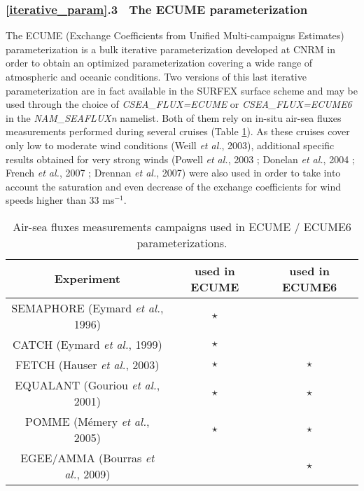 \subsubsection{\ref{iterative_param}.3 $~$ The ECUME parameterization \label{sct_UNITFP}}

The ECUME (Exchange Coefficients from Unified Multi-campaigns Estimates) parameterization is a bulk iterative parameterization 
developed at CNRM in order to obtain an optimized parameterization covering a wide range of atmospheric and oceanic conditions.
Two versions of this last iterative parameterization are in fact available in the SURFEX surface scheme and may be used through 
the choice of \textit{CSEA\_FLUX=\textquotesingle{}ECUME\textquotesingle{}} or \textit{CSEA\_FLUX=\textquotesingle{}ECUME6\textquotesingle{}}
in the \textit{NAM\_SEAFLUXn} namelist.
Both of them rely on in-situ air-sea fluxes measurements performed during several cruises (Table \ref{ecume_cruises}).
As these cruises cover only low to moderate wind conditions (Weill \textit{et al.}, 2003), %
additional specific results obtained for very strong winds 
(Powell \textit{et al.}, 2003 ; %
Donelan \textit{et al.}, 2004 ; %
French \textit{et al.}, 2007 ; %
Drennan \textit{et al.}, 2007) %
were also used in order to take into account the saturation and even decrease of the exchange coefficients
for wind speeds higher than 33 ms$^{-1}$.
\begin{table}[!h]
\centering
\begin{tabular}{|c|c|c|}
\hline
	Experiment & used in ECUME & used in ECUME6 \\
\hline
	SEMAPHORE (Eymard \textit{et al.}, 1996) & $\star$ & \\
\hline
	CATCH (Eymard \textit{et al.}, 1999) & $\star$ & \\
\hline
	FETCH (Hauser \textit{et al.}, 2003) & $\star$ & $\star$ \\
\hline
	EQUALANT (Gouriou \textit{et al.}, 2001) & $\star$ & $\star$ \\
\hline
	POMME (M\'emery \textit{et al.}, 2005) & $\star$ & $\star$ \\
\hline
	EGEE/AMMA (Bourras \textit{et al.}, 2009) &  & $\star$ \\
\hline
\end{tabular}
\caption{Air-sea fluxes measurements campaigns used in ECUME / ECUME6 parameterizations.
\label{ecume_cruises}}
\end{table}

